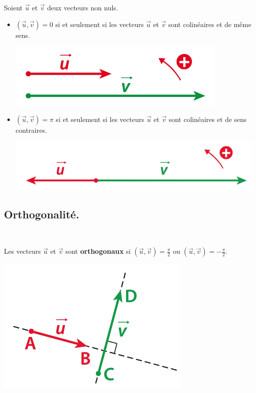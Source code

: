 \documentclass[a4paper,11pt]{article}
\theoremstyle{break}
\begin{document}
 \begin{theorem}
 Soient $\vec{u}$ et $\vec{v}$ deux vecteurs non nuls.
  \begin{itemize}
   \item $(\vec{u},\vec{v})=0$ si et seulement si les vecteurs $\vec{u}$ et $\vec{v}$ sont colinéaires
   et de même sens.
   \begin{center}
      \includegraphics[scale=0.5]{../Images/colMemeSens.png}
   \end{center}

   
   \item $(\vec{u},\vec{v})=\pi$ si et seulement si les vecteurs $\vec{u}$ et $\vec{v}$ sont colinéaires
   et de sens contraires.
   \begin{center}
      \includegraphics[scale=0.5]{../Images/colSensContraire.png}
   \end{center}
   
  \end{itemize}

 \end{theorem}
 
 \subsection{Orthogonalité.}
 
 \begin{definition}
 ~\vspace{-0.5cm}
 
   Les vecteurs $\vec{u}$ et $\vec{v}$ sont \textbf{orthogonaux} si
   $(\vec{u},\vec{v})=\frac{\pi}{2}$ ou $(\vec{u},\vec{v})=-\frac{\pi}{2}$.
   \begin{center}
      \includegraphics[scale=0.5]{../Images/Ortho.png}
   \end{center}

 \end{definition}
\end{document}
